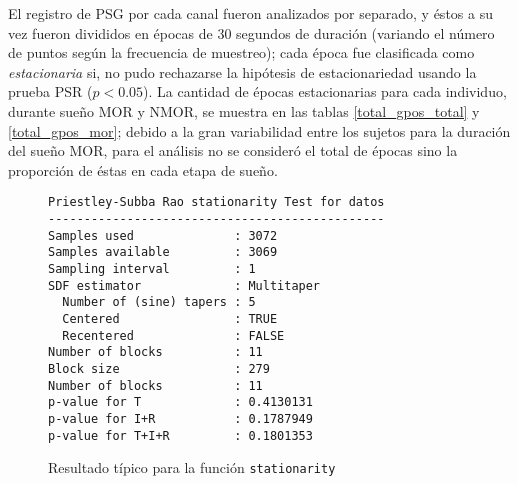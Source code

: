 El registro de PSG por cada canal fueron analizados por separado, y éstos a su vez fueron divididos
en épocas de 30 segundos de duración (variando el número de puntos según la frecuencia de muestreo);
cada época fue clasificada como \textit{estacionaria} si, no pudo rechazarse la hipótesis de 
estacionariedad usando la prueba PSR ($p < 0.05$).
La cantidad de épocas estacionarias para cada individuo, durante sueño MOR y NMOR, se muestra en 
las tablas \ref{total_gpos_total} y \ref{total_gpos_mor}; debido a la gran variabilidad entre los 
sujetos para la duración del sueño MOR, para el análisis no se consideró el total de épocas sino la 
proporción de éstas en cada etapa de sueño. 

\begin{figure}
\centering
\begin{lstlisting}[caption={}]
Priestley-Subba Rao stationarity Test for datos
-----------------------------------------------
Samples used              : 3072 
Samples available         : 3069 
Sampling interval         : 1 
SDF estimator             : Multitaper 
  Number of (sine) tapers : 5 
  Centered                : TRUE 
  Recentered              : FALSE 
Number of blocks          : 11 
Block size                : 279 
Number of blocks          : 11 
p-value for T             : 0.4130131 
p-value for I+R           : 0.1787949 
p-value for T+I+R         : 0.1801353 
\end{lstlisting}
\caption{Resultado típico para la función \texttt{stationarity}
}
\label{res_psr}
\end{figure}

